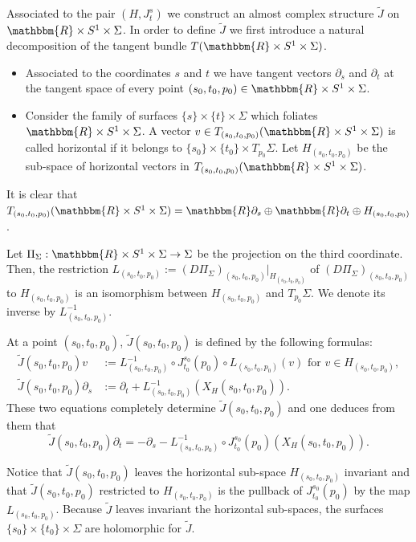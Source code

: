 \documentclass[AHL,Unicode,longabstracts,published]{cedram}
\newcommand{\R}{\mathbbm{R}}
\begin{document}
Associated to the pair $(H,J^s_t)$ we construct an almost complex structure $\widetilde{J}$ on $\R \times S^1 \times \Sigma$. In order to define $\widetilde{J}$ we first introduce a natural decomposition of the tangent bundle $T(\R \times S^1 \times \Sigma)$.
\begin{itemize}
\item Associated to the coordinates $s$ and $t$ we have tangent vectors $\partial_s$ and $\partial_t$ at the tangent space of every point $(s_0,t_0,p_0) \in \R \times S^1 \times \Sigma$.
\item Consider the family of surfaces $\{s\}\times \{t\} \times \Sigma$ which foliates $\R \times S^1 \times \Sigma$. A vector $v \in T_{(s_0,t_0,p_0)}(\R \times S^1 \times \Sigma)$ is called horizontal if it belongs to $\{s_0\}\times \{t_0\} \times T_{p_0}\Sigma$. Let $H_{(s_0,t_0,p_0)}$ be the sub-space of horizontal vectors in $T_{(s_0,t_0,p_0)}(\R \times S^1 \times \Sigma)$.
\end{itemize}
It is clear that $T_{(s_0,t_0,p_0)}(\R \times S^1 \times \Sigma) = \R \partial_s \oplus \R \partial_t \oplus H_{(s_0,t_0,p_0)}$.

Let $\Pi_\Sigma: \R \times S^1 \times \Sigma \to \Sigma$ be the projection on the third coordinate. Then, the restriction $L_{(s_0,t_0,p_0)}:= (D\Pi_\Sigma)_{(s_0,t_0,p_0)}|_{H_{(s_0,t_0,p_0)}}$ of $(D\Pi_\Sigma)_{(s_0,t_0,p_0)}$ to $H_{(s_0,t_0,p_0)}$ is an isomorphism between $H_{(s_0,t_0,p_0)}$ and $T_{p_0}\Sigma$. We denote its inverse by $L_{(s_0,t_0,p_0)}^{-1}$.

At a point $(s_0,t_0,p_0)$, $\widetilde{J}(s_0,t_0,p_0)$ is defined by the following formulas:
\begin{align*}
\widetilde{J}(s_0,t_0,p_0) v &:= L_{(s_0,t_0,p_0)}^{-1} \circ J^{s_0}_{t_0}(p_0) \circ L_{(s_0,t_0,p_0)}(v) \text{ for } v \in H_{(s_0,t_0,p_0)}, \\
\widetilde{J}(s_0,t_0,p_0) \partial_s &:= \partial_t + L_{(s_0,t_0,p_0)}^{-1}(X_H(s_0,t_0,p_0)).
\end{align*}
These two equations completely determine $\widetilde{J}(s_0,t_0,p_0)$ and one deduces from them that
\begin{equation*}
\widetilde{J}(s_0,t_0,p_0) \partial_t = -\partial_s - L_{(s_0,t_0,p_0)}^{-1} \circ J^{s_0}_{t_0}(p_0) (X_H(s_0,t_0,p_0)).
\end{equation*}

Notice that $\widetilde{J}(s_0,t_0,p_0)$ leaves the horizontal sub-space $H_{(s_0,t_0,p_0)}$ invariant and that \linebreak $\widetilde{J}(s_0,t_0,p_0)$ restricted to $H_{(s_0,t_0,p_0)}$ is the pullback of $J^{s_0}_{t_0}(p_0)$ by the map $L_{(s_0,t_0,p_0)}$. Because $\widetilde{J}$ leaves invariant the horizontal sub-spaces, the surfaces $\{s_0\}\times \{t_0\} \times \Sigma$ are holomorphic for $\widetilde{J}$.
\end{document}
